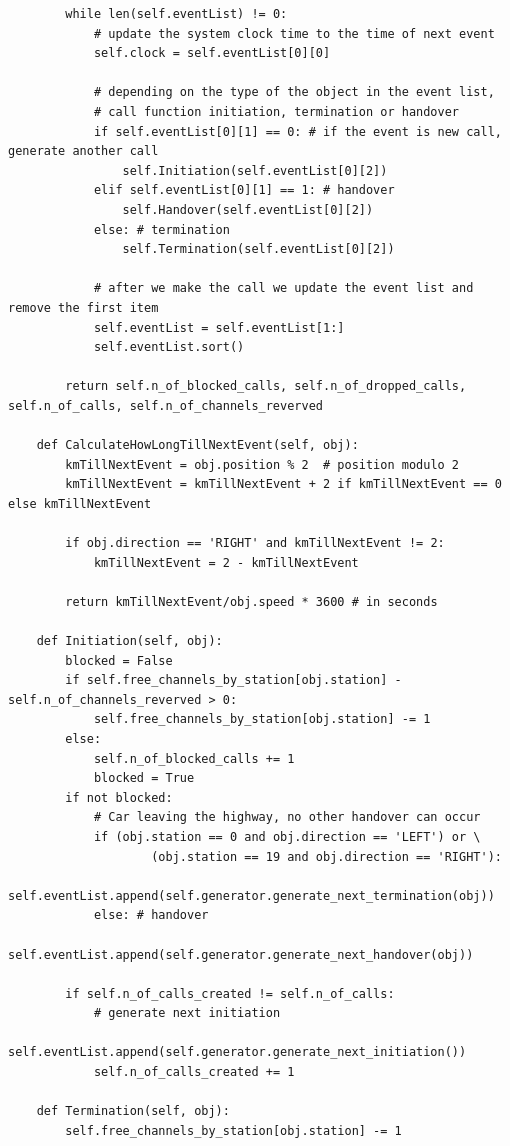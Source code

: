 \documentclass[12pt,a4paper]{article}
\begin{document}
\begin{lstlisting}
        while len(self.eventList) != 0:
            # update the system clock time to the time of next event
            self.clock = self.eventList[0][0]

            # depending on the type of the object in the event list,
            # call function initiation, termination or handover
            if self.eventList[0][1] == 0: # if the event is new call, generate another call
                self.Initiation(self.eventList[0][2])
            elif self.eventList[0][1] == 1: # handover
                self.Handover(self.eventList[0][2])
            else: # termination
                self.Termination(self.eventList[0][2])

            # after we make the call we update the event list and remove the first item
            self.eventList = self.eventList[1:]
            self.eventList.sort()

        return self.n_of_blocked_calls, self.n_of_dropped_calls, self.n_of_calls, self.n_of_channels_reverved

    def CalculateHowLongTillNextEvent(self, obj):
        kmTillNextEvent = obj.position % 2  # position modulo 2
        kmTillNextEvent = kmTillNextEvent + 2 if kmTillNextEvent == 0 else kmTillNextEvent

        if obj.direction == 'RIGHT' and kmTillNextEvent != 2:
            kmTillNextEvent = 2 - kmTillNextEvent

        return kmTillNextEvent/obj.speed * 3600 # in seconds

    def Initiation(self, obj):
        blocked = False
        if self.free_channels_by_station[obj.station] - self.n_of_channels_reverved > 0:
            self.free_channels_by_station[obj.station] -= 1
        else:
            self.n_of_blocked_calls += 1
            blocked = True
        if not blocked:
            # Car leaving the highway, no other handover can occur
            if (obj.station == 0 and obj.direction == 'LEFT') or \
                    (obj.station == 19 and obj.direction == 'RIGHT'):
                self.eventList.append(self.generator.generate_next_termination(obj))
            else: # handover
                self.eventList.append(self.generator.generate_next_handover(obj))

        if self.n_of_calls_created != self.n_of_calls:
            # generate next initiation
            self.eventList.append(self.generator.generate_next_initiation())
            self.n_of_calls_created += 1

    def Termination(self, obj):
        self.free_channels_by_station[obj.station] -= 1


\end{lstlisting}
\end{document}
